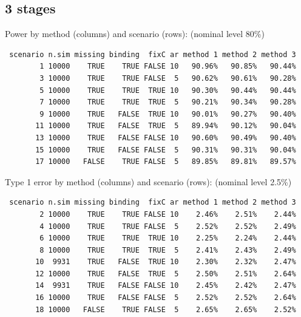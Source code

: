 \documentclass[12pt]{article}
\begin{document}
\clearpage

\subsection{3 stages}
\label{sec:orgc266b34}

Power by method (columns) and scenario (rows): \hfill (nominal level 80\%)
\begin{verbatim}
 scenario n.sim missing binding  fixC ar method 1 method 2 method 3
        1 10000    TRUE    TRUE FALSE 10   90.96%   90.85%   90.44%
        3 10000    TRUE    TRUE FALSE  5   90.62%   90.61%   90.28%
        5 10000    TRUE    TRUE  TRUE 10   90.30%   90.44%   90.44%
        7 10000    TRUE    TRUE  TRUE  5   90.21%   90.34%   90.28%
        9 10000    TRUE   FALSE  TRUE 10   90.01%   90.27%   90.40%
       11 10000    TRUE   FALSE  TRUE  5   89.94%   90.12%   90.04%
       13 10000    TRUE   FALSE FALSE 10   90.60%   90.49%   90.40%
       15 10000    TRUE   FALSE FALSE  5   90.31%   90.31%   90.04%
       17 10000   FALSE    TRUE FALSE  5   89.85%   89.81%   89.57%
\end{verbatim}


\bigskip

Type 1 error by method (columns) and scenario (rows): \hfill (nominal level 2.5\%)
\begin{verbatim}
 scenario n.sim missing binding  fixC ar method 1 method 2 method 3
        2 10000    TRUE    TRUE FALSE 10    2.46%    2.51%    2.44%
        4 10000    TRUE    TRUE FALSE  5    2.52%    2.52%    2.49%
        6 10000    TRUE    TRUE  TRUE 10    2.25%    2.24%    2.44%
        8 10000    TRUE    TRUE  TRUE  5    2.41%    2.43%    2.49%
       10  9931    TRUE   FALSE  TRUE 10    2.30%    2.32%    2.47%
       12 10000    TRUE   FALSE  TRUE  5    2.50%    2.51%    2.64%
       14  9931    TRUE   FALSE FALSE 10    2.45%    2.42%    2.47%
       16 10000    TRUE   FALSE FALSE  5    2.52%    2.52%    2.64%
       18 10000   FALSE    TRUE FALSE  5    2.65%    2.65%    2.52%
\end{verbatim}

\clearpage
\end{document}
